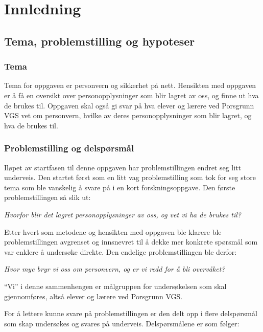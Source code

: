 \section{Innledning}

\subsection{Tema, problemstilling og hypoteser}\label{subsec:problemstilling}

\subsubsection{Tema}
Tema for oppgaven er personvern og sikkerhet på nett. Hensikten med oppgaven er å få en oversikt over personopplysninger som blir lagret av oss, og finne ut hva de brukes til. Oppgaven skal også gi svar på hva elever og lærere ved Porsgrunn VGS vet om personvern, hvilke av deres personopplysninger som blir lagret, og hva de brukes til.

\subsubsection{Problemstilling og delspørsmål}\label{subsubsec:problemstilling}
Iløpet av startfasen til denne oppgaven har problemstillingen endret seg litt underveis. Den startet først som en litt vag problemstilling som tok for seg store tema som ble vanskelig å svare på i en kort forskningsoppgave. Den første problemstillingen så slik ut:

\textit{Hvorfor blir det lagret personopplysninger av oss, og vet vi ha de brukes til?}

Etter hvert som metodene og hensikten med oppgaven ble klarere ble problemstillingen avgrenset og innsnevret til å dekke mer konkrete spørsmål som var enklere å undersøke direkte. Den endelige problemstillingen ble derfor:

\textit{Hvor mye bryr vi oss om personvern, og er vi redd for å bli overvåket?}

``Vi'' i denne sammenhengen er målgruppen for undersøkelsen som skal gjennomføres, altså elever og lærere ved Porsgrunn VGS. 

For å lettere kunne svare på problemstillingen er den delt opp i flere delspørsmål som skap undersøkes og svares på underveis. Delspørsmålene er som følger:

